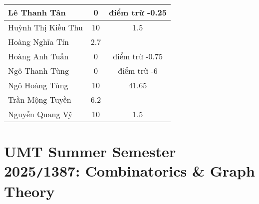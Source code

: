 \documentclass{article}
\begin{document}
\begin{table}[H]
\begin{tabular}{|l|c|c|}
        \hline
        Lê Thanh Tân & 0 & điểm trừ -0.25 \\
        \hline
        Huỳnh Thị Kiều Thu & 10 & 1.5 \\
        \hline
        Hoàng Nghĩa Tín & 2.7 &  \\
        \hline
        Hoàng Anh Tuấn & 0 & điểm trừ -0.75 \\
        \hline
        Ngô Thanh Tùng & 0 & điểm trừ -6 \\
        \hline
        Ngô Hoàng Tùng & 10 & 41.65 \\
        \hline
        Trần Mộng Tuyền & 6.2 &  \\
        \hline
        Nguyễn Quang Vỹ & 10 & 1.5 \\
        \hline
    \end{tabular}
\end{table}


\section{UMT Summer Semester 2025{\tt/}1387: Combinatorics \& Graph Theory}
\end{document}
